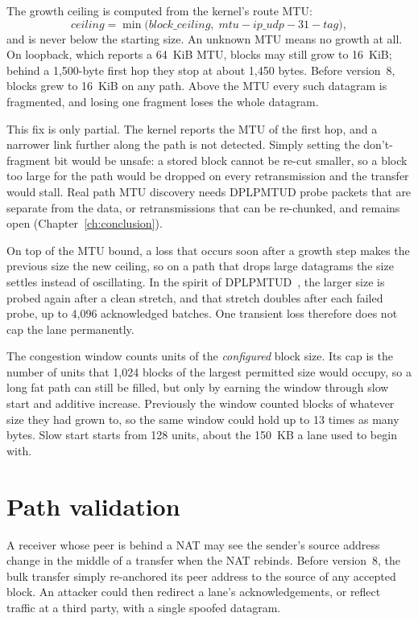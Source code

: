 The growth ceiling is computed from the kernel's route MTU:
\[
\mathit{ceiling}=\min\bigl(\mathit{block\_ceiling},\;\mathit{mtu}-\mathit{ip\_udp}-31-\mathit{tag}\bigr),
\]
and is never below the starting size. An unknown MTU means no growth at all. On loopback, which reports a
64~KiB MTU, blocks may still grow to 16~KiB; behind a 1,500-byte first hop they stop at about 1,450 bytes.
Before version~8, blocks grew to 16~KiB on any path. Above the MTU every such datagram is fragmented, and losing
one fragment loses the whole datagram.

This fix is only partial. The kernel reports the MTU of the first hop, and a narrower link further along the
path is not detected. Simply setting the don't-fragment bit would be unsafe: a stored block cannot be re-cut
smaller, so a block too large for the path would be dropped on every retransmission and the transfer would
stall. Real path MTU discovery needs DPLPMTUD probe packets that are separate from the data, or retransmissions
that can be re-chunked, and remains open (Chapter~\ref{ch:conclusion}).

On top of the MTU bound, a loss that occurs soon after a growth step makes the previous size the new ceiling,
so on a path that drops large datagrams the size settles instead of oscillating. In the spirit of
DPLPMTUD~\cite{rfc8899}, the larger size is probed again after a clean stretch, and that stretch doubles after
each failed probe, up to 4,096 acknowledged batches. One transient loss therefore does not cap the lane
permanently.

The congestion window counts units of the \emph{configured} block size. Its cap is the number of units that
1,024 blocks of the largest permitted size would occupy, so a long fat path can still be filled, but only by
earning the window through slow start and additive increase. Previously the window counted blocks of whatever
size they had grown to, so the same window could hold up to 13 times as many bytes. Slow start starts from 128
units, about the 150~KB a lane used to begin with.

\section{Path validation}\label{sec:path}

A receiver whose peer is behind a NAT may see the sender's source address change in the middle of a transfer
when the NAT rebinds. Before version~8, the bulk transfer simply re-anchored its peer address to the source of
any accepted block. An attacker could then redirect a lane's acknowledgements, or reflect traffic at a third
party, with a single spoofed datagram.

